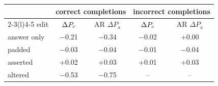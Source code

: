 \begin{tabular}{@{}lcccc@{}}
\toprule
 & \multicolumn{2}{c}{correct completions} & \multicolumn{2}{c}{incorrect completions} \\ \cmidrule(lr){2-3}\cmidrule(l){4-5}
edit & \kev{} $\Delta P_{\mathrm{c}}$ & AR $\Delta P_{\mathrm{a}}$ & \kev{} $\Delta P_{\mathrm{c}}$ & AR $\Delta P_{\mathrm{a}}$ \\ \midrule
answer only & $-$0.21 & $-$0.34 & $-$0.02 & $+$0.00 \\
padded & $-$0.03 & $-$0.04 & $-$0.01 & $-$0.04 \\
asserted & $+$0.02 & $+$0.03 & $+$0.01 & $+$0.03 \\
altered & $-$0.53 & $-$0.75 & -- & -- \\
\bottomrule
\end{tabular}
